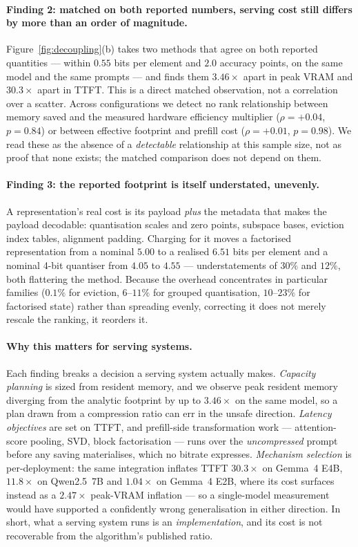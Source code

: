 \documentclass[sigplan,10pt,anonymous,review,nonacm]{acmart}
\begin{document}
\paragraph{Finding 2: matched on both reported numbers, serving
cost still differs by more than an order of magnitude.}\label{M-find2}
Figure~\ref{fig:decoupling}(b) takes two methods that agree on both reported
quantities --- within $0.55$ bits per element and $2.0$ accuracy points, on
the same model and the same prompts --- and finds them $3.46\times$ apart in
peak VRAM and $30.3\times$ apart in TTFT. This is a direct matched
observation, not a correlation over a scatter. Across configurations we detect
no rank relationship between memory saved and the measured hardware efficiency
multiplier ($\rho = {+}0.04$, $p = 0.84$) or between effective footprint and
prefill cost ($\rho = {+}0.01$, $p = 0.98$). We read these as the absence of a
\emph{detectable} relationship at this sample size, not as proof that none
exists; the matched comparison does not depend on them.

\paragraph{Finding 3: the reported footprint is itself
understated, unevenly.}\label{M-find3}
A representation's real cost is its payload \emph{plus} the metadata that
makes the payload decodable: quantisation scales and zero points, subspace
bases, eviction index tables, alignment padding. Charging for it moves a
factorised representation from a nominal $5.00$ to a realised $6.51$ bits per
element and a nominal 4-bit quantiser from $4.05$ to $4.55$ ---
understatements of $30\%$ and $12\%$, both flattering the method. Because the
overhead concentrates in particular families ($0.1\%$ for eviction,
$6$--$11\%$ for grouped quantisation, $10$--$23\%$ for factorised state)
rather than spreading evenly, correcting it does not merely rescale the
ranking, it reorders it.

\paragraph{Why this matters for serving systems.}\label{M-why}
Each finding breaks a decision a serving system actually makes.
\emph{Capacity planning} is sized from resident memory, and we observe peak
resident memory diverging from the analytic footprint by up to $3.46\times$ on
the same model, so a plan drawn from a compression ratio can err in the unsafe
direction. \emph{Latency objectives} are set on TTFT, and prefill-side
transformation work --- attention-score pooling, SVD, block factorisation ---
runs over the \emph{uncompressed} prompt before any saving materialises, which
no bitrate expresses. \emph{Mechanism selection} is per-deployment: the same
integration inflates TTFT $30.3\times$ on Gemma~4 E4B, $11.8\times$ on
Qwen2.5~7B and $1.04\times$ on Gemma~4 E2B, where its cost surfaces instead as
a $2.47\times$ peak-VRAM inflation --- so a single-model measurement would
have supported a confidently wrong generalisation in either direction. In
short, what a serving system runs is an \emph{implementation}, and its cost is
not recoverable from the algorithm's published ratio.
\end{document}
